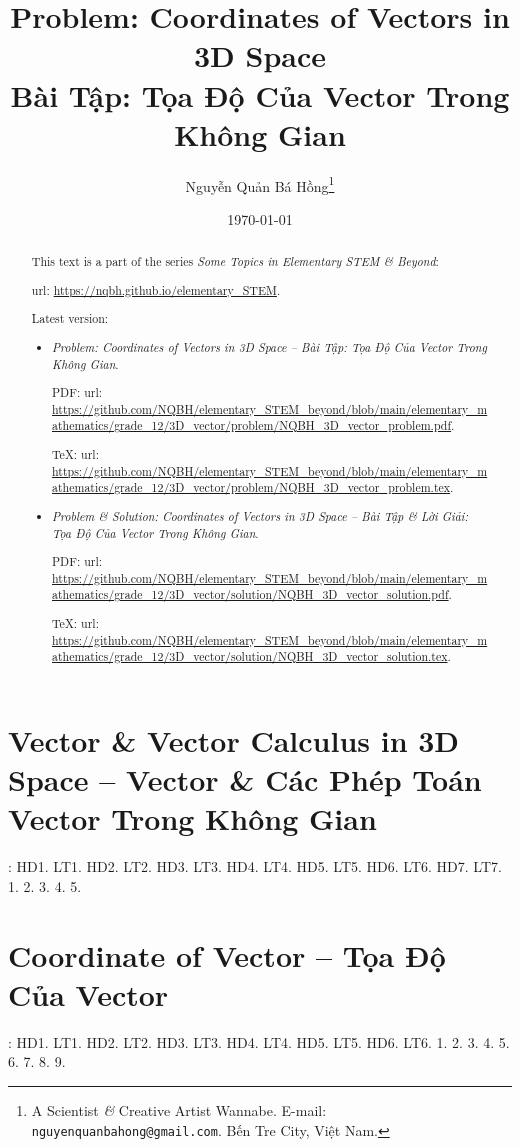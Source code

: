 \documentclass{article}
\title{Problem: Coordinates of Vectors in 3D Space\\Bài Tập: Tọa Độ Của Vector Trong Không Gian}
\author{Nguyễn Quản Bá Hồng\footnote{A Scientist {\it\&} Creative Artist Wannabe. E-mail: {\tt nguyenquanbahong@gmail.com}. Bến Tre City, Việt Nam.}}
\date{\today}
\begin{document}
\maketitle
\begin{abstract}
	This text is a part of the series {\it Some Topics in Elementary STEM \& Beyond}:
	
	{\sc url}: \url{https://nqbh.github.io/elementary_STEM}.
	
	Latest version:
	\begin{itemize}
		\item {\it Problem: Coordinates of Vectors in 3D Space -- Bài Tập: Tọa Độ Của Vector Trong Không Gian}.
		
		PDF: {\sc url}: \url{https://github.com/NQBH/elementary_STEM_beyond/blob/main/elementary_mathematics/grade_12/3D_vector/problem/NQBH_3D_vector_problem.pdf}.
		
		\TeX: {\sc url}: \url{https://github.com/NQBH/elementary_STEM_beyond/blob/main/elementary_mathematics/grade_12/3D_vector/problem/NQBH_3D_vector_problem.tex}.
		\item {\it Problem \& Solution: Coordinates of Vectors in 3D Space -- Bài Tập \& Lời Giải: Tọa Độ Của Vector Trong Không Gian}.
		
		PDF: {\sc url}: \url{https://github.com/NQBH/elementary_STEM_beyond/blob/main/elementary_mathematics/grade_12/3D_vector/solution/NQBH_3D_vector_solution.pdf}.
		
		\TeX: {\sc url}: \url{https://github.com/NQBH/elementary_STEM_beyond/blob/main/elementary_mathematics/grade_12/3D_vector/solution/NQBH_3D_vector_solution.tex}.
	\end{itemize}
\end{abstract}
\tableofcontents


\section{Vector \& Vector Calculus in 3D Space -- Vector \& Các Phép Toán Vector Trong Không Gian}
\cite[Chap. II, \S1, pp. 56--64]{SGK_Toan_12_Canh_Dieu_tap_1}: HD1. LT1. HD2. LT2. HD3. LT3. HD4. LT4. HD5. LT5. HD6. LT6. HD7. LT7. 1. 2. 3. 4. 5.


\section{Coordinate of Vector -- Tọa Độ Của Vector}
\cite[Chap. II, \S2, pp. 56--73]{SGK_Toan_12_Canh_Dieu_tap_1}: HD1. LT1. HD2. LT2. HD3. LT3. HD4. LT4. HD5. LT5. HD6. LT6. 1. 2. 3. 4. 5. 6. 7. 8. 9.
\end{document}

